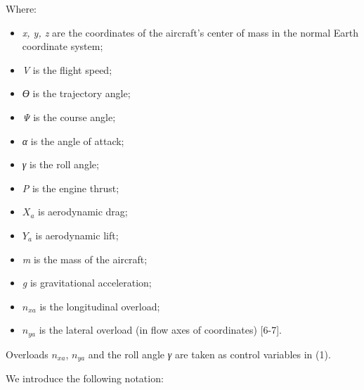 \begin{multicols}{2}

Where:

\begin{minipage}[t]{0.45\textwidth}
  \begin{itemize}
    \setlength{\itemindent}{1cm}
    \item \emph{x, y, z} are the coordinates of the aircraft’s center of mass in the normal Earth coordinate system;
    \item \emph{V} is the flight speed;
    \item \emph{ϴ} is the trajectory angle;
    \item \emph{Ψ} is the course angle;
    \item \emph{α} is the angle of attack;
    \item \emph{γ} is the roll angle;
    \item \emph{P} is the engine thrust;
  \end{itemize}
  \end{minipage}%
  \hfill
  \begin{minipage}[t]{0.45\textwidth}
  \begin{itemize}
    \setlength{\itemindent}{1cm}
    
    \item \(X_{a}\) is aerodynamic drag;
    \item \(Y_{a}\) is aerodynamic lift;
    \item \emph{m} is the mass of the aircraft;
    \item \emph{g} is gravitational acceleration;
    \item \(n_{xa}\) is the longitudinal overload;
    \item \(n_{ya}\) is the lateral overload (in flow axes of coordinates) {[}6-7{]}.
  \end{itemize}
  \end{minipage}
  





Overloads \(n_{xa}\), \(n_{ya}\) and the roll angle \emph{γ} are taken
as control variables in (1).

\newpage

We introduce the following notation:

\end{multicols}

